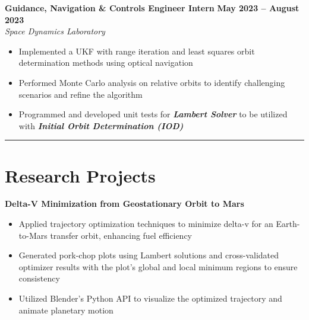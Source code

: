 \documentclass[10pt]{article}
\newcommand{\sectionline}{\noindent\rule{\linewidth}{0.4pt}}
\begin{document}
	\textbf{Guidance, Navigation \& Controls Engineer Intern} \hfill \textbf{May 2023 – August 2023} \\
	\emph{Space Dynamics Laboratory}
	\begin{itemize}
	    \item Implemented a UKF with range iteration and least squares orbit determination methods using optical navigation
	    \item Performed Monte Carlo analysis on relative orbits to identify challenging scenarios and refine the algorithm
	    \item Programmed and developed unit tests for \textbf{\emph{Lambert Solver}} to be utilized with \textbf{\emph{Initial Orbit Determination (IOD)}}
	\end{itemize}
	
	\sectionline
	
	\section*{Research Projects}
	
	\textbf{Delta-V Minimization from Geostationary Orbit to Mars}
	\begin{itemize}
		\item Applied trajectory optimization techniques to minimize delta-v for an Earth-to-Mars transfer orbit, enhancing fuel efficiency
		\item Generated pork-chop plots using Lambert solutions and cross-validated optimizer results with the plot’s global and local minimum regions to ensure consistency
		\item Utilized Blender’s Python API to visualize the optimized trajectory and animate planetary motion
	\end{itemize}
	
\end{document}
